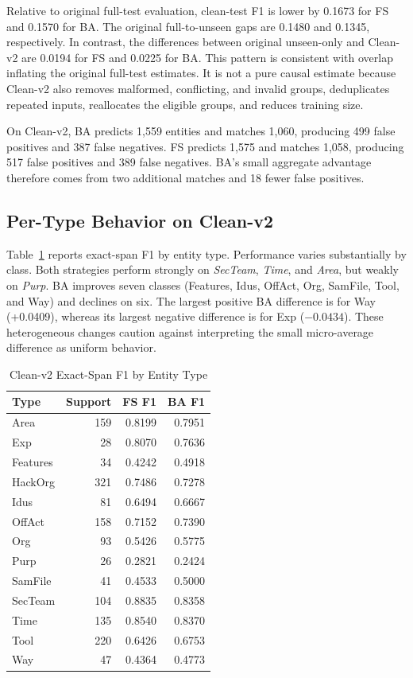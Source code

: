 \documentclass[conference]{IEEEtran}
\begin{document}
Relative to original full-test evaluation, clean-test F1 is lower by 0.1673 for FS and 0.1570 for BA. The original full-to-unseen gaps are 0.1480 and 0.1345, respectively. In contrast, the differences between original unseen-only and Clean-v2 are 0.0194 for FS and 0.0225 for BA. This pattern is consistent with overlap inflating the original full-test estimates. It is not a pure causal estimate because Clean-v2 also removes malformed, conflicting, and invalid groups, deduplicates repeated inputs, reallocates the eligible groups, and reduces training size.

On Clean-v2, BA predicts 1,559 entities and matches 1,060, producing 499 false positives and 387 false negatives. FS predicts 1,575 and matches 1,058, producing 517 false positives and 389 false negatives. BA's small aggregate advantage therefore comes from two additional matches and 18 fewer false positives.

\subsection{Per-Type Behavior on Clean-v2}
Table~\ref{tab:per-type} reports exact-span F1 by entity type. Performance varies substantially by class. Both strategies perform strongly on \textit{SecTeam}, \textit{Time}, and \textit{Area}, but weakly on \textit{Purp}. BA improves seven classes (Features, Idus, OffAct, Org, SamFile, Tool, and Way) and declines on six. The largest positive BA difference is for Way (+0.0409), whereas its largest negative difference is for Exp ($-0.0434$). These heterogeneous changes caution against interpreting the small micro-average difference as uniform behavior.

\begin{table}[t]
\caption{Clean-v2 Exact-Span F1 by Entity Type}
\label{tab:per-type}
\centering
\small
\begin{tabular}{lrrr}
\toprule
Type & Support & FS F1 & BA F1 \\
\midrule
Area & 159 & 0.8199 & 0.7951 \\
Exp & 28 & 0.8070 & 0.7636 \\
Features & 34 & 0.4242 & 0.4918 \\
HackOrg & 321 & 0.7486 & 0.7278 \\
Idus & 81 & 0.6494 & 0.6667 \\
OffAct & 158 & 0.7152 & 0.7390 \\
Org & 93 & 0.5426 & 0.5775 \\
Purp & 26 & 0.2821 & 0.2424 \\
SamFile & 41 & 0.4533 & 0.5000 \\
SecTeam & 104 & 0.8835 & 0.8358 \\
Time & 135 & 0.8540 & 0.8370 \\
Tool & 220 & 0.6426 & 0.6753 \\
Way & 47 & 0.4364 & 0.4773 \\
\bottomrule
\end{tabular}
\end{table}
\end{document}
